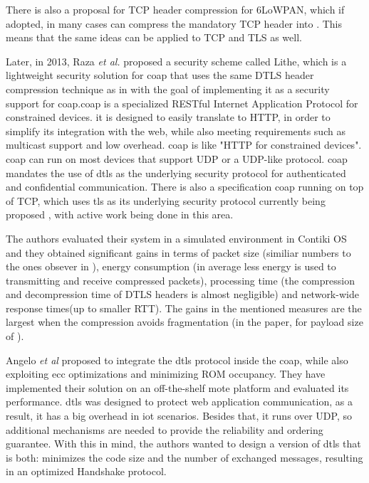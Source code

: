 \documentclass{llncs}
\begin{document}
There is also a proposal for TCP header compression for 6LoWPAN\cite{I-D.aayadi-6lowpan-tcphc},
which if adopted, in many cases can compress the mandatory  TCP header
into . This means that the same ideas can be applied to TCP and
TLS as well.

Later, in 2013, Raza \textit{et al.} proposed a security scheme called Lithe\cite{LitheLig40:online},
which is a lightweight security solution for \gls{coap} that uses the same DTLS header
compression technique as in \cite{6LoWPANC53:online} with the goal of implementing
it as a security support for \gls{coap}.\gls{coap}\cite{RFC7959} is a specialized
RESTful Internet Application Protocol for constrained devices. it is designed to easily
translate to HTTP, in order to simplify its integration with the web,
while also meeting requirements such as multicast support and low overhead.
\gls{coap} is like "HTTP for constrained devices".
\gls{coap} can run on most devices that support UDP or a UDP-like protocol.
\gls{coap} mandates the use of \gls{dtls} as the underlying security protocol for
authenticated and confidential communication. There is also a specification \gls{coap}
running on top of TCP, which uses \gls{tls} as its underlying security protocol
currently being proposed \cite{I-D.ietf-core-coap-tcp-tls},
with active work being done in this area.


The authors evaluated their system in a simulated environment in Contiki OS and
they obtained significant gains in terms of packet size (similiar numbers to the
ones obsever in \cite{6LoWPANC53:online}), energy consumption (in average  less
energy is used to transmitting and receive compressed packets), processing time
(the compression and decompression time of DTLS headers is almost negligible)
and network-wide response times(up to  smaller RTT). The
gains in the mentioned measures are the largest when the compression avoids
fragmentation (in the paper, for payload size of ).

Angelo \textit{et al} \cite{Security5:online} proposed to integrate the \gls{dtls} protocol
inside the \gls{coap}, while also exploiting \gls{ecc} optimizations and minimizing
ROM occupancy. They have implemented their solution on an off-the-shelf mote platform
and evaluated its performance. \gls{dtls} was designed to protect web application communication, as a result,
it has a big overhead in \gls{iot} scenarios. Besides that, it runs over UDP,
so additional mechanisms are needed to provide the reliability and ordering
guarantee. With this in mind, the authors wanted to design a version of \gls{dtls}
that is both: minimizes the code size and the number of exchanged messages, resulting
in an optimized Handshake protocol.
\end{document}
